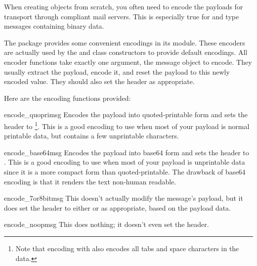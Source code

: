 
When creating  objects from scratch, you often need to
encode the payloads for transport through compliant mail servers.
This is especially true for  and 
type messages containing binary data.

The  package provides some convenient encodings in its
 module.  These encoders are actually used by the
 and  class constructors to provide default
encodings.  All encoder functions take exactly one argument, the message
object to encode.  They usually extract the payload, encode it, and reset the
payload to this newly encoded value.  They should also set the
 header as appropriate.

Here are the encoding functions provided:

\begin{funcdesc}{encode_quopri}{msg}
Encodes the payload into quoted-printable form and sets the
 header to
\footnote{Note that encoding with
 also encodes all tabs and space characters in
the data.}.
This is a good encoding to use when most of your payload is normal
printable data, but contains a few unprintable characters.
\end{funcdesc}

\begin{funcdesc}{encode_base64}{msg}
Encodes the payload into base64 form and sets the
 header to
.  This is a good encoding to use when most of your payload
is unprintable data since it is a more compact form than
quoted-printable.  The drawback of base64 encoding is that it
renders the text non-human readable.
\end{funcdesc}

\begin{funcdesc}{encode_7or8bit}{msg}
This doesn't actually modify the message's payload, but it does set
the  header to either  or
 as appropriate, based on the payload data.
\end{funcdesc}

\begin{funcdesc}{encode_noop}{msg}
This does nothing; it doesn't even set the
 header.
\end{funcdesc}
